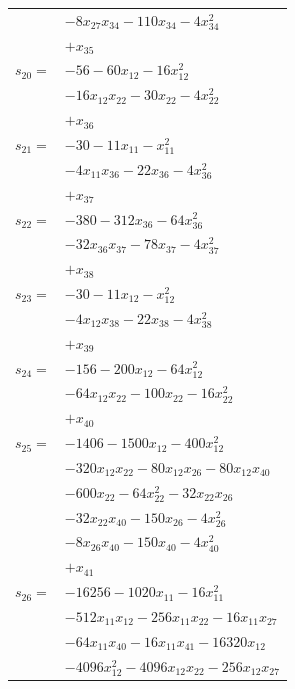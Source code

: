 \begin{longtable}{@{}r@{\;}l@{}}
 & \(\displaystyle -8x_{27}x_{34} -110x_{34} -4x_{34}^{2}\) \\
 & \(\displaystyle +x_{35}\) \\[3pt]
\(s_{20}=\) & \(\displaystyle -56 -60x_{12} -16x_{12}^{2}\) \\
 & \(\displaystyle -16x_{12}x_{22} -30x_{22} -4x_{22}^{2}\) \\
 & \(\displaystyle +x_{36}\) \\[3pt]
\(s_{21}=\) & \(\displaystyle -30 -11x_{11} -x_{11}^{2}\) \\
 & \(\displaystyle -4x_{11}x_{36} -22x_{36} -4x_{36}^{2}\) \\
 & \(\displaystyle +x_{37}\) \\[3pt]
\(s_{22}=\) & \(\displaystyle -380 -312x_{36} -64x_{36}^{2}\) \\
 & \(\displaystyle -32x_{36}x_{37} -78x_{37} -4x_{37}^{2}\) \\
 & \(\displaystyle +x_{38}\) \\[3pt]
\(s_{23}=\) & \(\displaystyle -30 -11x_{12} -x_{12}^{2}\) \\
 & \(\displaystyle -4x_{12}x_{38} -22x_{38} -4x_{38}^{2}\) \\
 & \(\displaystyle +x_{39}\) \\[3pt]
\(s_{24}=\) & \(\displaystyle -156 -200x_{12} -64x_{12}^{2}\) \\
 & \(\displaystyle -64x_{12}x_{22} -100x_{22} -16x_{22}^{2}\) \\
 & \(\displaystyle +x_{40}\) \\[3pt]
\(s_{25}=\) & \(\displaystyle -1406 -1500x_{12} -400x_{12}^{2}\) \\
 & \(\displaystyle -320x_{12}x_{22} -80x_{12}x_{26} -80x_{12}x_{40}\) \\
 & \(\displaystyle -600x_{22} -64x_{22}^{2} -32x_{22}x_{26}\) \\
 & \(\displaystyle -32x_{22}x_{40} -150x_{26} -4x_{26}^{2}\) \\
 & \(\displaystyle -8x_{26}x_{40} -150x_{40} -4x_{40}^{2}\) \\
 & \(\displaystyle +x_{41}\) \\[3pt]
\(s_{26}=\) & \(\displaystyle -16256 -1020x_{11} -16x_{11}^{2}\) \\
 & \(\displaystyle -512x_{11}x_{12} -256x_{11}x_{22} -16x_{11}x_{27}\) \\
 & \(\displaystyle -64x_{11}x_{40} -16x_{11}x_{41} -16320x_{12}\) \\
 & \(\displaystyle -4096x_{12}^{2} -4096x_{12}x_{22} -256x_{12}x_{27}\) \\

\end{longtable}
